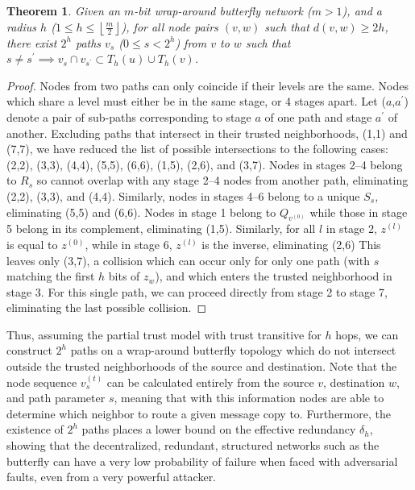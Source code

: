 \documentclass{sig-alternate-05-2015}
\newtheorem{theorem}{Theorem}
\begin{document}
\begin{theorem}
Given an $m$-bit wrap-around butterfly network ($m > 1$),
and a radius $h$ ($1 \leq h \leq \left\lfloor \frac{m}{2} \right\rfloor$),
for all node pairs $(v, w)$ such that $d(v,w) \geq 2h$,
there exist $2^h$ paths $v_s$ ($0 \le s < 2^h$) from
$v$ to $w$ such that
$s \neq s^\prime \implies v_s \cap v_{s^\prime} \subset T_h(u) \cup T_h(v)$.
\end{theorem}
\begin{proof}
Nodes from two paths can only coincide if their levels are the same.
Nodes which share a level must either be in the same stage, or 4 stages
apart.
Let ($a$,$a^\prime$) denote a pair of sub-paths corresponding to stage $a$ of
one path and stage $a^\prime$ of another.
Excluding paths that intersect in their trusted neighborhoods, (1,1) and (7,7),
we have reduced the list of possible intersections to the following cases:
(2,2), (3,3), (4,4), (5,5), (6,6), (1,5), (2,6), and (3,7).
Nodes in stages 2--4 belong to $R_s$ so cannot overlap with any stage 2--4
nodes from another path, eliminating (2,2), (3,3), and (4,4).
Similarly, nodes in stages 4--6 belong to a unique $S_s$,
eliminating (5,5) and (6,6).
Nodes in stage 1 belong to $Q_{v^{(0)}}$ while those in stage 5 belong in
its complement, eliminating (1,5).
Similarly, for all $l$ in stage 2, $z^{(l)}$ is equal to $z^{(0)}$,
while in stage 6, $z^{(l)}$ is the inverse, eliminating (2,6)
This leaves only (3,7), a collision which can occur only for only one path
(with $s$ matching the first $h$ bits of $z_w$), and which enters the trusted
neighborhood in stage 3.
For this single path, we can proceed directly from stage 2 to stage 7,
eliminating the last possible collision.
\end{proof}

Thus, assuming the partial trust model with trust transitive
for $h$ hops, we can construct $2^h$ paths on a wrap-around butterfly topology
which do not intersect outside the trusted neighborhoods of the source and
destination.
Note that the node sequence $v_s^{(t)}$ can be calculated entirely
from the source $v$, destination $w$, and path parameter $s$,
meaning that with this information nodes are able to determine which neighbor
to route a given message copy to.
Furthermore, the existence of $2^h$ paths places a lower bound on the
effective redundancy $\delta_h$,
showing that the decentralized, redundant, structured networks such as the
butterfly can have a very low probability of failure when faced with
adversarial faults, even from a very powerful attacker.
\end{document}
